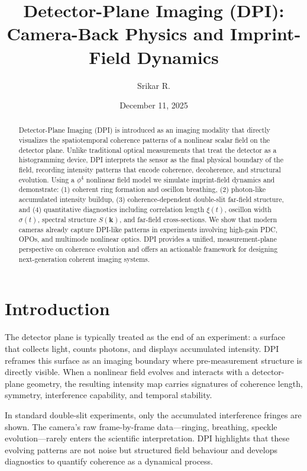 

\title{Detector-Plane Imaging (DPI): Camera-Back Physics and Imprint-Field Dynamics}
\author{Srikar R.}
\date{December 11, 2025}

\begin{abstract}
Detector-Plane Imaging (DPI) is introduced as an imaging modality that directly visualizes the spatiotemporal coherence patterns of a nonlinear scalar field on the detector plane. Unlike traditional optical measurements that treat the detector as a histogramming device, DPI interprets the sensor as the final physical boundary of the field, recording intensity patterns that encode coherence, decoherence, and structural evolution. Using a $\phi^4$ nonlinear field model we simulate imprint-field dynamics and demonstrate: (1) coherent ring formation and oscillon breathing, (2) photon-like accumulated intensity buildup, (3) coherence-dependent double-slit far-field structure, and (4) quantitative diagnostics including correlation length $\xi(t)$, oscillon width $\sigma(t)$, spectral structure $S(\mathbf{k})$, and far-field cross-sections. We show that modern cameras already capture DPI-like patterns in experiments involving high-gain PDC, OPOs, and multimode nonlinear optics. DPI provides a unified, measurement-plane perspective on coherence evolution and offers an actionable framework for designing next-generation coherent imaging systems.
\end{abstract}

\maketitle


\section{Introduction}
The detector plane is typically treated as the end of an experiment: a surface that collects light, counts photons, and displays accumulated intensity. DPI reframes this surface as an imaging boundary where pre-measurement structure is directly visible. When a nonlinear field evolves and interacts with a detector-plane geometry, the resulting intensity map carries signatures of coherence length, symmetry, interference capability, and temporal stability.

In standard double-slit experiments, only the accumulated interference fringes are shown. The camera's raw frame-by-frame data—ringing, breathing, speckle evolution—rarely enters the scientific interpretation. DPI highlights that these evolving patterns are not noise but structured field behaviour and develops diagnostics to quantify coherence as a dynamical process.

